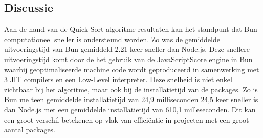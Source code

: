 \subsection{Discussie}
Aan de hand van de Quick Sort algoritme resultaten kan het standpunt dat Bun computationeel sneller is ondersteund worden.
Zo was de gemiddelde uitvoeringstijd van Bun gemiddeld 2.21 keer sneller dan Node.js. Deze snellere uitvoeringstijd komt door de
het gebruik van de JavaScriptScore engine in Bun waarbij geoptimaliseerde machine code wordt geproduceerd in 
samenwerking met 3 JIT compilers en een Low-Level interpreter.
Deze snelheid is niet enkel zichtbaar bij het algoritme, maar ook bij de installatietijd van de packages.
Zo is Bun me teen gemiddelde installatietijd van 24,9 milliseconden 24,5 keer sneller is dan Node.js met een 
gemiddelde installatietijd van 610,1 milleseconden. Dit kan een groot verschil betekenen op vlak van efficiëntie in projecten met een groot aantal packages.
